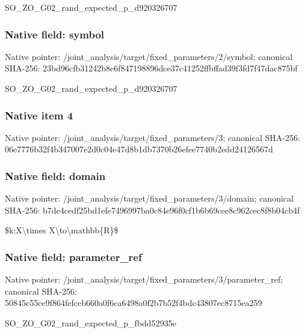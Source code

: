 \documentclass[10pt,a4paper]{article}
\begin{document}
\begingroup\raggedright\sloppy SO\_\allowbreak{}ZO\_\allowbreak{}G02\_\allowbreak{}rand\_\allowbreak{}expected\_\allowbreak{}p\_\allowbreak{}d920326707\par\endgroup

\subsubsection{Native field: symbol}
Native pointer: /joint\_\allowbreak{}analysis/target/fixed\_\allowbreak{}parameters/2/symbol; canonical SHA-256: 23bd96cfb31242b8e6f847198896dce37c41252ffbffad39f3fd7f47dac875bf

\begingroup\raggedright\sloppy SO\_\allowbreak{}ZO\_\allowbreak{}G02\_\allowbreak{}rand\_\allowbreak{}expected\_\allowbreak{}p\_\allowbreak{}d920326707\par\endgroup

\subsubsection{Native item 4}
Native pointer: /joint\_\allowbreak{}analysis/target/fixed\_\allowbreak{}parameters/3; canonical SHA-256: 06e7776b32f4b347007e2d0c04e47d8b1db7370b26efee7740b2edd24126567d

\subsubsection{Native field: domain}
Native pointer: /joint\_\allowbreak{}analysis/target/fixed\_\allowbreak{}parameters/3/domain; canonical SHA-256: b7de4cedf25bd1efe7496997ba0c84e96f0cf1b6b69cee8c962cec8f8b04cb4f

\begingroup\raggedright\sloppy \$k:\allowbreak{}X\textbackslash{}times X\textbackslash{}to\textbackslash{}mathbb\{R\}\$\par\endgroup

\subsubsection{Native field: parameter\_\allowbreak{}ref}
Native pointer: /joint\_\allowbreak{}analysis/target/fixed\_\allowbreak{}parameters/3/parameter\_\allowbreak{}ref; canonical SHA-256: 50845c55ce9f864fefceb660a0f6ca6498a0f2b7b52f4bdc43807ec8715ea259

\begingroup\raggedright\sloppy SO\_\allowbreak{}ZO\_\allowbreak{}G02\_\allowbreak{}rand\_\allowbreak{}expected\_\allowbreak{}p\_\allowbreak{}fbdd52935e\par\endgroup
\end{document}
